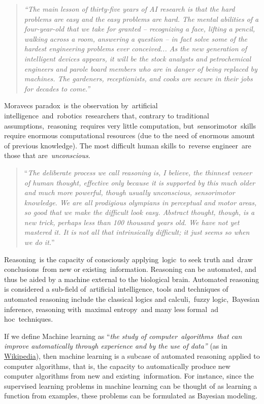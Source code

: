 \documentclass[11pt]{book}
\begin{document}
\begin{quote}
\emph{``The main lesson of thirty-five years of AI research is that the
hard problems are easy and the easy problems are hard. The mental
abilities of a four-year-old that we take for granted -- recognizing a
face, lifting a pencil, walking across a room, answering a question --
in fact solve some of the hardest engineering problems ever conceived...
As the new generation of intelligent devices appears, it will be the
stock analysts and petrochemical engineers and parole board members who
are in danger of being replaced by machines. The gardeners,
receptionists, and cooks are secure in their jobs for decades to
come.''}\cite{pinker_language_1994}
\end{quote}

Moravec\textquotesingle s paradox~is the observation by~artificial
intelligence~and~robotics~researchers that, contrary to traditional
assumptions,~reasoning~requires very little computation,
but~sensorimotor~skills require enormous computational resources (due to
the need of enormous amount of previous knowledge). The most difficult
human skills to~reverse engineer~are those that are~\emph{unconscious}.

\begin{quote}
``\emph{The deliberate process we call reasoning is, I believe, the
thinnest veneer of human thought, effective only because it is supported
by this much older and much more powerful, though usually unconscious,
sensorimotor knowledge. We are all prodigious olympians in perceptual
and motor areas, so good that we make the difficult look easy. Abstract
thought, though, is a new trick, perhaps less than 100 thousand years
old. We have not yet mastered it. It is not all that intrinsically
difficult; it just seems so when we do it.}''
\cite{moravec_mind_1988}
\end{quote}

Reasoning~is the capacity of consciously applying~logic~to seek truth
and~draw conclusions~from new or existing~information. Reasoning can be
automated, and thus be aided by a machine external to the biological
brain. Automated reasoning is considered a sub-field of~artificial
intelligence, tools and techniques of automated reasoning include the
classical logics and calculi,~fuzzy logic,~Bayesian inference, reasoning
with~maximal entropy~and many less formal~ad hoc~techniques.

If we define Machine learning as ``\emph{the study of
computer~algorithms~that can improve automatically through experience
and by the use of data''} (as in
\href{https://en.wikipedia.org/wiki/Machine_learning}{Wikipedia}), then
machine learning is a subcase of automated reasoning applied to computer
algorithms, that is, the capacity to automatically produce new computer
algorithms from new and existing~information. For instance, since the
supervised learning problems in machine learning can be thought of as
learning a function from examples, these problems can be formulated as
Bayesian
modeling\cite{rasmussen_gaussian_2006}.
\end{document}
